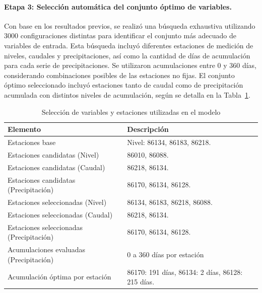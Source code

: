 \paragraph{Etapa 3: Selección automática del conjunto óptimo de variables.}
Con base en los resultados previos, se realizó una búsqueda exhaustiva utilizando 3000 configuraciones distintas para identificar el conjunto más adecuado de variables de entrada. Esta búsqueda incluyó diferentes estaciones de medición de niveles, caudales y precipitaciones, así como la cantidad de días de acumulación para cada serie de precipitaciones. Se utilizaron acumulaciones entre 0 y 360 días, considerando combinaciones posibles de las estaciones no fijas. El conjunto óptimo seleccionado incluyó estaciones tanto de caudal como de precipitación acumulada con distintos niveles de acumulación, según se detalla en la Tabla~\ref{tab:variables_seleccionadas}.

\begin{table}[h]
  \centering
  \caption{Selección de variables y estaciones utilizadas en el modelo}
  \label{tab:variables_seleccionadas}
  \begin{tabular}{@{}ll@{}}
    \toprule
    \textbf{Elemento}                   & \textbf{Descripción}                                                                              \\ \midrule
    Estaciones base                     & Nivel: 86134, 86183, 86218.                                                                      \\
    Estaciones candidatas (Nivel)      & 86010, 86088.                                                                                   \\
    Estaciones candidatas (Caudal)     & 86218, 86134.                                                                                   \\
    Estaciones candidatas (Precipitación)& 86170, 86134, 86128.                                                                            \\ \midrule
    Estaciones seleccionadas (Nivel)    & 86134, 86183, 86218, 86088.                                                                      \\
    Estaciones seleccionadas (Caudal)   & 86218, 86134.                                                                                   \\
    Estaciones seleccionadas (Precipitación) & 86170, 86134, 86128.                                                                        \\
    Acumulaciones evaluadas (Precipitación)   & 0 a 360 días por estación                                                                    \\
    Acumulación óptima por estación    & 86170: 191 días, 86134: 2 días, 86128: 215 días.                                                 \\ \bottomrule
  \end{tabular}
\end{table}


